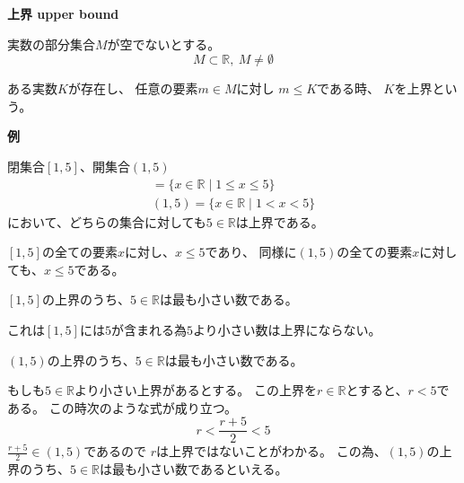 \documentclass[12pt,b5paper]{ltjsarticle}
\begin{document}
\textbf{上界 upper bound}

実数の部分集合$M$が空でないとする。
\begin{equation}
 M \subset \mathbb{R}, \ M \ne \emptyset
\end{equation}

ある実数$K$が存在し、
任意の要素$m \in M$に対し
$m \leq K$である時、
$K$を上界という。


\dotfill

\textbf{例}

閉集合$[1,5]$、開集合$(1,5)$
\begin{gather}
 [1,5] = \{ x \in \mathbb{R} \mid 1\leq x \leq 5\}\\
 (1,5) = \{ x \in \mathbb{R} \mid 1 < x < 5\}
\end{gather}
において、どちらの集合に対しても$5\in\mathbb{R}$は上界である。

$[1,5]$の全ての要素$x$に対し、$x\leq 5$であり、
同様に$(1,5)$の全ての要素$x$に対しても、$x\leq 5$である。

\dotfill

$[1,5]$の上界のうち、$5\in\mathbb{R}$は最も小さい数である。

これは$[1,5]$には$5$が含まれる為$5$より小さい数は上界にならない。

\dotfill

$(1,5)$の上界のうち、$5\in\mathbb{R}$は最も小さい数である。

もしも$5\in\mathbb{R}$より小さい上界があるとする。
この上界を$r\in\mathbb{R}$とすると、$r<5$である。
この時次のような式が成り立つ。
\begin{equation}
 r< \frac{r+5}{2} <5
\end{equation}
$\frac{r+5}{2} \in (1,5)$であるので $r$は上界ではないことがわかる。
この為、$(1,5)$の上界のうち、$5\in\mathbb{R}$は最も小さい数であるといえる。
\end{document}
